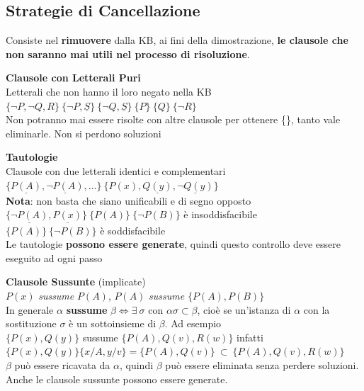 \documentclass[10pt]{book}
\begin{document}
\subsection{Strategie di Cancellazione}
Consiste nel \textbf{rimuovere} dalla KB, ai fini della dimostrazione, \textbf{le clausole che non saranno mai utili nel processo di risoluzione}.
\begin{list}{}{}
	\item \textbf{Clausole con Letterali Puri}\\
	Letterali che non hanno il loro negato nella KB\\
	$\{\neg P, \neg Q, R\}\:\{\neg P, \underline{S}\}\:\{\neg Q, \underline{S}\}\:\{P\}\:\{Q\}\:\{\neg R\}$\\
	Non potranno mai essere risolte con altre clausole per ottenere \{\}, tanto vale eliminarle. Non si perdono soluzioni
	\item \textbf{Tautologie}\\
	Clausole con due letterali identici e complementari\\
	$\{\underline{P(A)}, \underline{\neg P(A)}, \ldots\}\:\{P(x), \underline{Q(y)}, \underline{\neg Q(y)}\}$\\
	\textbf{Nota}: non basta che siano unificabili e di segno opposto\\
	$\{\underline{\neg P(A)}, \underline{P(x)}\}\:\{P(A)\}\:\{\neg P(B)\}$ è insoddisfacibile\\
	$\{P(A)\}\:\{\neg P(B)\}$ è soddisfacibile\\	
	Le tautologie \textbf{possono essere generate}, quindi questo controllo deve essere eseguito ad ogni passo
	\item \textbf{Clausole Sussunte} (implicate)\\
	$P(x)$ \textit{sussume} $P(A)$, $P(A)$ \textit{sussume} $\{P(A), P(B)\}$\\
	In generale $\alpha$ \textbf{sussume} $\beta \Leftrightarrow \exists\:\sigma$ con $\alpha\sigma \subset \beta$, cioè se un'istanza di $\alpha$ con la sostituzione $\sigma$ è un sottoinsieme di $\beta$. Ad esempio\\
	$\{P(x), Q(y)\}$ sussume $\{P(A), Q(v), R(w)\}$ infatti $\{P(x), Q(y)\}\{x/A, y/v\}=\{P(A), Q(v)\}\:\subset\:\{P(A), Q(v), R(w)\}$\\
	$\beta$ può essere ricavata da $\alpha$, quindi $\beta$ può essere eliminata senza perdere soluzioni. Anche le clausole sussunte possono essere generate.
\end{list}
\pagebreak
\end{document}
